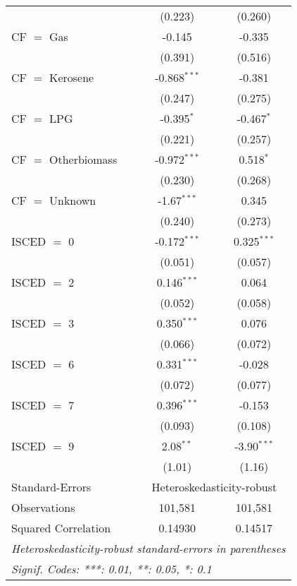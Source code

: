 \begin{table}[htbp!]
\begin{adjustbox}{width = 1\textwidth, max height = 0.95\textheight, center}
\begin{threeparttable}[b]
\begin{tabular}{lcc}
                                 & (0.223)        & (0.260)\\   
            CF $=$ Gas           & -0.145         & -0.335\\   
                                 & (0.391)        & (0.516)\\   
            CF $=$ Kerosene      & -0.868$^{***}$ & -0.381\\   
                                 & (0.247)        & (0.275)\\   
            CF $=$ LPG           & -0.395$^{*}$   & -0.467$^{*}$\\   
                                 & (0.221)        & (0.257)\\   
            CF $=$ Otherbiomass  & -0.972$^{***}$ & 0.518$^{*}$\\   
                                 & (0.230)        & (0.268)\\   
            CF $=$ Unknown       & -1.67$^{***}$  & 0.345\\   
                                 & (0.240)        & (0.273)\\   
            ISCED $=$ 0          & -0.172$^{***}$ & 0.325$^{***}$\\   
                                 & (0.051)        & (0.057)\\   
            ISCED $=$ 2          & 0.146$^{***}$  & 0.064\\   
                                 & (0.052)        & (0.058)\\   
            ISCED $=$ 3          & 0.350$^{***}$  & 0.076\\   
                                 & (0.066)        & (0.072)\\   
            ISCED $=$ 6          & 0.331$^{***}$  & -0.028\\   
                                 & (0.072)        & (0.077)\\   
            ISCED $=$ 7          & 0.396$^{***}$  & -0.153\\   
                                 & (0.093)        & (0.108)\\   
            ISCED $=$ 9          & 2.08$^{**}$    & -3.90$^{***}$\\   
                                 & (1.01)         & (1.16)\\   
            \midrule 
            Standard-Errors & \multicolumn{2}{c}{Heteroskedasticity-robust} \\ 
            Observations         & 101,581        & 101,581\\  
            Squared Correlation  & 0.14930        & 0.14517\\  
            \midrule \midrule
            \multicolumn{3}{l}{\emph{Heteroskedasticity-robust standard-errors in parentheses}}\\
            \multicolumn{3}{l}{\emph{Signif. Codes: ***: 0.01, **: 0.05, *: 0.1}}\\
         \end{tabular}
         

\end{threeparttable}
\end{adjustbox}
\end{table}
